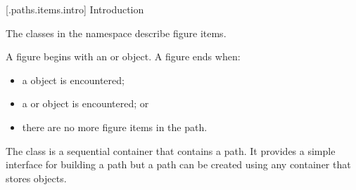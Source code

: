
 [\iotwod.paths.items.intro] {Introduction}

\pnum
The classes in the  namespace describe figure items.

\pnum
A figure begins with an  or  object. A figure ends when:

\begin{itemize}
\item a  object is encountered;
\item a  or  object is encountered; or
\item there are no more figure items in the path.
\end{itemize}

\pnum
The  class is a sequential container that contains a path. It provides a simple interface for building a path but a path can be created using any container that stores  objects.
